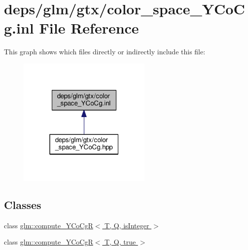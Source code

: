\hypertarget{color__space__YCoCg_8inl}{}\section{deps/glm/gtx/color\+\_\+space\+\_\+\+Y\+Co\+Cg.inl File Reference}
\label{color__space__YCoCg_8inl}
This graph shows which files directly or indirectly include this file\+:
\nopagebreak
\begin{figure}[H]
\begin{center}
\leavevmode
\includegraphics[width=184pt]{d2/dd6/color__space__YCoCg_8inl__dep__incl}
\end{center}
\end{figure}
\subsection*{Classes}
\begin{DoxyCompactItemize}
\item 
class \hyperlink{classglm_1_1compute__YCoCgR}{glm\+::compute\+\_\+\+Y\+Co\+Cg\+R$<$ T, Q, is\+Integer $>$}
\item 
class \hyperlink{classglm_1_1compute__YCoCgR_3_01T_00_01Q_00_01true_01_4}{glm\+::compute\+\_\+\+Y\+Co\+Cg\+R$<$ T, Q, true $>$}
\end{DoxyCompactItemize}

